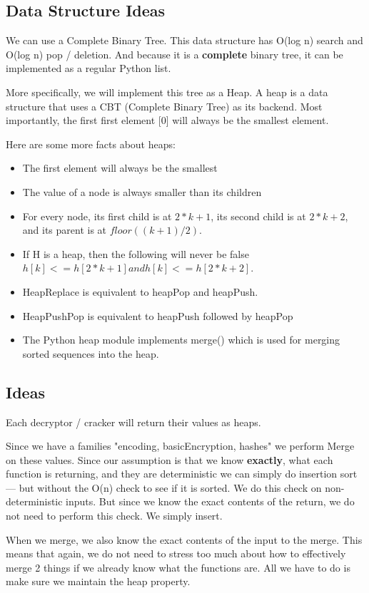 \documentclass{article}
\theoremstyle{definition}
\begin{document}
\subsection{Data Structure Ideas}
We can use a Complete Binary Tree. This data structure has O(log n) search and O(log n) pop / deletion. And because it is a \textbf{complete} binary tree, it can be implemented as a regular Python list.

More specifically, we will implement this tree as a Heap. A heap is a data structure that uses a CBT (Complete Binary Tree) as its backend. Most importantly, the first first element [0] will always be the smallest element.

Here are some more facts about heaps:
\begin{itemize}
	\item The first element will always be the smallest
	\item The value of a node is always smaller than its children
	\item For every node, its first child is at $2*k + 1$, its second child is at $2*k + 2$, and its parent is at $floor((k + 1) / 2)$.
	\item If H is a heap, then the following will never be false $
h[k] <= h[2*k + 1] and h[k] <= h[2*k + 2]$. 
\item HeapReplace is equivalent to heapPop and heapPush. 
\item HeapPushPop is equivalent to heapPush followed by heapPop
\item The Python heap module implements merge() which is used for merging sorted sequences into the heap.
\end{itemize}

\subsection{Ideas}
Each decryptor / cracker will return their values as heaps.

Since we have a families "encoding, basicEncryption, hashes" we perform Merge on these values.
Since our assumption is that we know \textbf{exactly}, what each function is returning, and they are deterministic we can simply do insertion sort --- but without the O(n) check to see if it is sorted. We do this check on non-deterministic inputs. But since we know the exact contents of the return, we do not need to perform this check. We simply insert.

When we merge, we also know the exact contents of the input to the merge. This means that again, we do not need to stress too much about how to effectively merge 2 things if we already know what the functions are. All we have to do is make sure we maintain the heap property.
\end{document}
